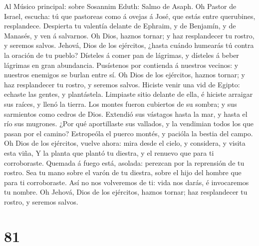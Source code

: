  Al Músico principal: sobre Sosannim Eduth: Salmo de
Asaph. Oh Pastor de Israel, escucha: tú que pastoreas como á ovejas á
José, que estás entre querubines, resplandece.  Despierta
tu valentía delante de Ephraim, y de Benjamín, y de Manasés, y ven á
salvarnos.  Oh Dios, haznos tornar; y haz resplandecer tu
rostro, y seremos salvos.  Jehová, Dios de los ejércitos,
¿hasta cuándo humearás tú contra la oración de tu pueblo? 
Dísteles á comer pan de lágrimas, y dísteles á beber lágrimas en gran
abundancia.  Pusístenos por contienda á nuestros vecinos:
y nuestros enemigos se burlan entre sí.  Oh Dios de los
ejércitos, haznos tornar; y haz resplandecer tu rostro, y seremos
salvos.  Hiciste venir una vid de Egipto: echaste las
gentes, y plantástela.  Limpiaste sitio delante de ella, é
hiciste arraigar sus raíces, y llenó la tierra.  Los
montes fueron cubiertos de su sombra; y sus sarmientos como cedros de
Dios.  Extendió sus vástagos hasta la mar, y hasta el río
sus mugrones.  ¿Por qué aportillaste sus vallados, y la
vendimian todos los que pasan por el camino?  Estropeóla
el puerco montés, y pacióla la bestia del campo.  Oh Dios
de los ejércitos, vuelve ahora: mira desde el cielo, y considera, y
visita esta viña,  Y la planta que plantó tu diestra, y
el renuevo que para ti corroboraste.  Quemada á fuego
está, asolada: perezcan por la reprensión de tu rostro. 
Sea tu mano sobre el varón de tu diestra, sobre el hijo del hombre que
para ti corroboraste.  Así no nos volveremos de ti: vida
nos darás, é invocaremos tu nombre.  Oh Jehová, Dios de
los ejércitos, haznos tornar; haz resplandecer tu rostro, y seremos
salvos.

\hypertarget{section-80}{%
\section{81}\label{section-80}}

